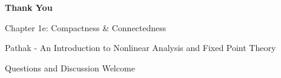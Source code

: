 \documentclass[aspectratio=169,10pt]{beamer}
\theoremstyle{definition}
\begin{document}
\begin{frame}
\centering
\Large
\textbf{Thank You}

\vspace{1cm}

Chapter 1e: Compactness \& Connectedness

Pathak - An Introduction to Nonlinear Analysis and Fixed Point Theory

\vspace{1cm}

Questions and Discussion Welcome
\end{frame}
\end{document}
